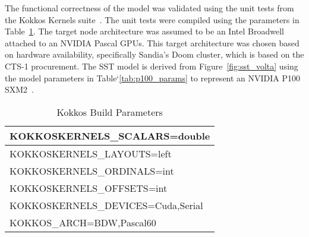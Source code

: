 The functional correctness of the model was validated using the unit tests from
the Kokkos Kernels suite~\cite{kokkos_kernels}. The unit tests were compiled
using the parameters in Table~\ref{tab:kokkos_build}. The target node
architecture was assumed to be an Intel Broadwell attached to an NVIDIA Pascal
GPUs. This target architecture was chosen based on hardware availability,
specifically Sandia's Doom cluster, which is based on the CTS-1
procurement. The SST model is derived from Figure~\ref{fig:sst_volta} using the
model parameters in Table`\ref{tab:p100_params} to represent an NVIDIA P100
SXM2~\cite{p100}.

    \begin{table}[!htbp]
        \centering
        \setlength{\abovecaptionskip}{6pt plus 1pt minus 1pt}
        \captionsetup{width=.75\textwidth}
        \caption{Kokkos Build Parameters}
        \begin{tabular}{|l|}
            \hline
            KOKKOSKERNELS\_SCALARS=double          \\ \hline
            KOKKOSKERNELS\_LAYOUTS=left            \\ \hline
            KOKKOSKERNELS\_ORDINALS=int            \\ \hline
            KOKKOSKERNELS\_OFFSETS=int             \\ \hline
            KOKKOSKERNELS\_DEVICES=Cuda,Serial     \\ \hline
            KOKKOS\_ARCH=BDW,Pascal60              \\ \hline
         \end{tabular}
        \label{tab:kokkos_build}
    \end{table}

